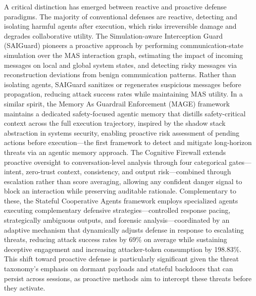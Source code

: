 \documentclass[11pt]{article}
\begin{document}
A critical distinction has emerged between reactive and proactive defense paradigms. The majority of conventional defenses are reactive, detecting and isolating harmful agents after execution, which risks irreversible damage and degrades collaborative utility. The Simulation-aware Interception Guard (SAIGuard) \cite{ref426} pioneers a proactive approach by performing communication-state simulation over the MAS interaction graph, estimating the impact of incoming messages on local and global system states, and detecting risky messages via reconstruction deviations from benign communication patterns. Rather than isolating agents, SAIGuard sanitizes or regenerates suspicious messages before propagation, reducing attack success rates while maintaining MAS utility. In a similar spirit, the Memory As Guardrail Enforcement (MAGE) framework \cite{ref427} maintains a dedicated safety-focused agentic memory that distills safety-critical context across the full execution trajectory, inspired by the shadow stack abstraction in systems security, enabling proactive risk assessment of pending actions before execution---the first framework to detect and mitigate long-horizon threats via an agentic memory approach. The Cognitive Firewall \cite{ref428} extends proactive oversight to conversation-level analysis through four categorical gates---intent, zero-trust context, consistency, and output risk---combined through escalation rather than score averaging, allowing any confident danger signal to block an interaction while preserving auditable rationale. Complementary to these, the Stateful Cooperative Agents framework \cite{ref429} employs specialized agents executing complementary defensive strategies---controlled response pacing, strategically ambiguous outputs, and forensic analysis---coordinated by an adaptive mechanism that dynamically adjusts defense in response to escalating threats, reducing attack success rates by 69\% on average while sustaining deceptive engagement and increasing attacker-token consumption by 198.83\%. This shift toward proactive defense is particularly significant given the threat taxonomy's emphasis on dormant payloads and stateful backdoors that can persist across sessions, as proactive methods aim to intercept these threats before they activate.
\end{document}
